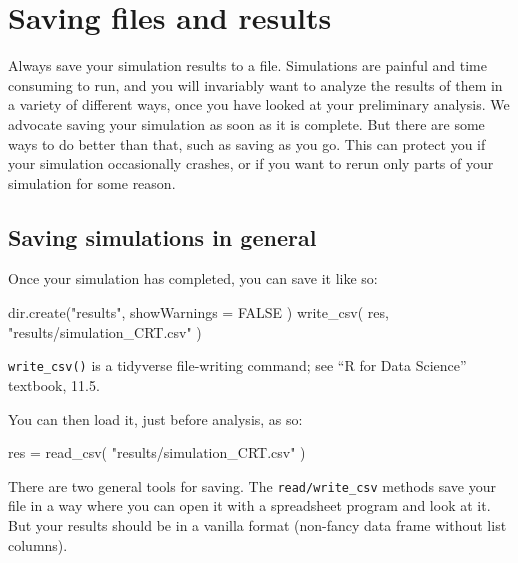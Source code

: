 \documentclass[
]{book}
\newenvironment{Shaded}{\begin{snugshade}}{\end{snugshade}}
\newcommand{\AttributeTok}[1]{\textcolor[rgb]{0.77,0.63,0.00}{#1}}
\newcommand{\ConstantTok}[1]{\textcolor[rgb]{0.00,0.00,0.00}{#1}}
\newcommand{\FunctionTok}[1]{\textcolor[rgb]{0.00,0.00,0.00}{#1}}
\newcommand{\NormalTok}[1]{#1}
\newcommand{\OtherTok}[1]{\textcolor[rgb]{0.56,0.35,0.01}{#1}}
\newcommand{\StringTok}[1]{\textcolor[rgb]{0.31,0.60,0.02}{#1}}
\begin{document}
\hypertarget{saving_files}{%
\chapter{Saving files and results}\label{saving_files}}

Always save your simulation results to a file.
Simulations are painful and time consuming to run, and you will invariably want to analyze the results of them in a variety of different ways, once you have looked at your preliminary analysis.
We advocate saving your simulation as soon as it is complete.
But there are some ways to do better than that, such as saving as you go.
This can protect you if your simulation occasionally crashes, or if you want to rerun only parts of your simulation for some reason.

\hypertarget{saving-simulations-in-general}{%
\section{Saving simulations in general}\label{saving-simulations-in-general}}

Once your simulation has completed, you can save it like so:

\begin{Shaded}
\begin{Highlighting}[]
\FunctionTok{dir.create}\NormalTok{(}\StringTok{"results"}\NormalTok{, }\AttributeTok{showWarnings =} \ConstantTok{FALSE}\NormalTok{ )}
\FunctionTok{write\_csv}\NormalTok{( res, }\StringTok{"results/simulation\_CRT.csv"}\NormalTok{ )}
\end{Highlighting}
\end{Shaded}

\texttt{write\_csv()} is a tidyverse file-writing command; see ``R for Data Science''
textbook, 11.5.

You can then load it, just before analysis, as so:

\begin{Shaded}
\begin{Highlighting}[]
\NormalTok{res }\OtherTok{=} \FunctionTok{read\_csv}\NormalTok{( }\StringTok{"results/simulation\_CRT.csv"}\NormalTok{ )}
\end{Highlighting}
\end{Shaded}

There are two general tools for saving. The \texttt{read/write\_csv} methods save your file in a way where you can open it with a spreadsheet program and look at it.
But your results should be in a vanilla format (non-fancy data frame without list columns).
\end{document}
